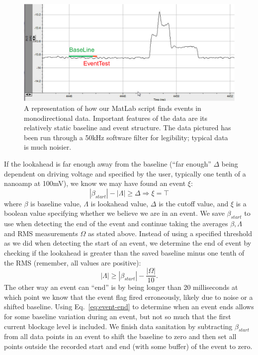 \documentclass[aps,prl,preprint,groupedaddress]{revtex4}
\begin{document}
\begin{figure}
\centering
\includegraphics[width=1\textwidth]{figures/find-events}
\caption{A representation of how our MatLab script finds events in monodirectional data. Important features of the data are its relatively static baseline and event structure. The data pictured has been run through a 50kHz software filter for legibility; typical data is much noisier.}
\label{fig:find-events}
\end{figure}

If the lookahead is far enough away from the baseline (``far enough'' \(\Delta\) being dependent on driving voltage and specified by the user, typically one tenth of a nanoamp at 100mV), we know we may have found an event \(\xi\):
\begin{equation} |\beta_{start}| - |\Lambda| \geq \Delta \Rightarrow \xi = \top \label{eq:event-start}\end{equation}
where \(\beta\) is baseline value, \(\Lambda\) is lookahead value, \(\Delta\) is the cutoff value, and \(\xi\) is a boolean value specifying whether we believe we are in an event.
We save \(\beta_{start}\) to use when detecting the end of the event and continue taking the averages \(\beta, \Lambda\) and RMS measurements \(\Omega\) as stated above.
Instead of using a specified threshold as we did when detecting the start of an event, we determine the end of event by checking if the lookahead is greater than the saved baseline minus one tenth of the RMS (remember, all values are positive):
\begin{equation}|\Lambda| \geq |\beta_{start}| - \frac{|\Omega|}{10}. \label{eq:event-end}\end{equation}
The other way an event can ``end'' is by being longer than 20 milliseconds at which point we know that the event flag fired erroneously, likely due to noise or a shifted baseline.
Using Eq.~\ref{eq:event-end} to determine when an event ends allows for some baseline variation during an event, but not so much that the first current blockage level is included.
We finish data sanitation by subtracting \(\beta_{start}\) from all data points in an event to shift the baseline to zero and then set all points outside the recorded start and end (with some buffer) of the event to zero.
\end{document}
